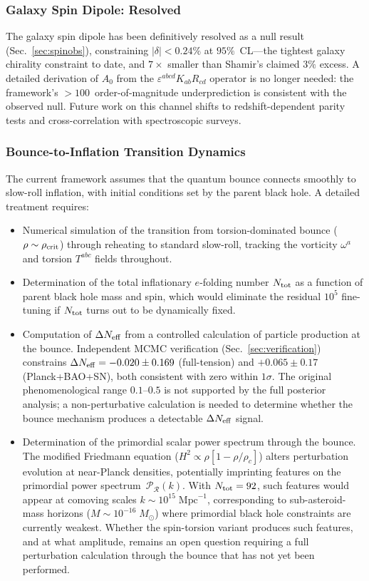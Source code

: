 \documentclass[aps,prd,twocolumn,superscriptaddress,showpacs,preprintnumbers,nofootinbib,longbibliography,floatfix]{revtex4-2}
\newcommand{\rhocrit}{\rho_{\rm crit}}
\newcommand{\Neff}{N_{\rm eff}}
\begin{document}
\subsubsection{Galaxy Spin Dipole: Resolved}

The galaxy spin dipole has been definitively resolved as a null result (Sec.~\ref{sec:spinobs}), constraining $|\delta| < 0.24\%$ at $95\%$~CL---the tightest galaxy chirality constraint to date, and $7\times$ smaller than Shamir's claimed $3\%$ excess. A detailed derivation of $A_0$ from the $\varepsilon^{abcd}K_{ab}R_{cd}$ operator is no longer needed: the framework's $>100$~order-of-magnitude underprediction is consistent with the observed null. Future work on this channel shifts to redshift-dependent parity tests and cross-correlation with spectroscopic surveys.

\subsubsection{Bounce-to-Inflation Transition Dynamics}

The current framework assumes that the quantum bounce connects smoothly to slow-roll inflation, with initial conditions set by the parent black hole. A detailed treatment requires:

\begin{itemize}[leftmargin=*]
\item Numerical simulation of the transition from torsion-dominated bounce ($\rho\sim\rhocrit$) through reheating to standard slow-roll, tracking the vorticity $\omega^a$ and torsion $T^{abc}$ fields throughout.
\item Determination of the total inflationary $e$-folding number $N_{\rm tot}$ as a function of parent black hole mass and spin, which would eliminate the residual $10^5$ fine-tuning if $N_{\rm tot}$ turns out to be dynamically fixed.
\item Computation of $\Delta\Neff$ from a controlled calculation of particle production at the bounce. Independent MCMC verification (Sec.~\ref{sec:verification}) constrains $\Delta\Neff = -0.020 \pm 0.169$ (full-tension) and $+0.065 \pm 0.17$ (Planck+BAO+SN), both consistent with zero within $1\sigma$. The original phenomenological range $0.1$--$0.5$ is not supported by the full posterior analysis; a non-perturbative calculation is needed to determine whether the bounce mechanism produces a detectable $\Delta\Neff$ signal.
\item Determination of the primordial scalar power spectrum through the bounce. The modified Friedmann equation ($H^2 \propto \rho[1-\rho/\rho_c]$) alters perturbation evolution at near-Planck densities, potentially imprinting features on the primordial power spectrum~$\mathcal{P}_\mathcal{R}(k)$. With $N_{\rm tot} = 92$, such features would appear at comoving scales $k \sim 10^{15}\;\text{Mpc}^{-1}$, corresponding to sub-asteroid-mass horizons ($M \sim 10^{-16}\;M_\odot$) where primordial black hole constraints are currently weakest. Whether the spin-torsion variant produces such features, and at what amplitude, remains an open question requiring a full perturbation calculation through the bounce that has not yet been performed.
\end{itemize}
\end{document}
